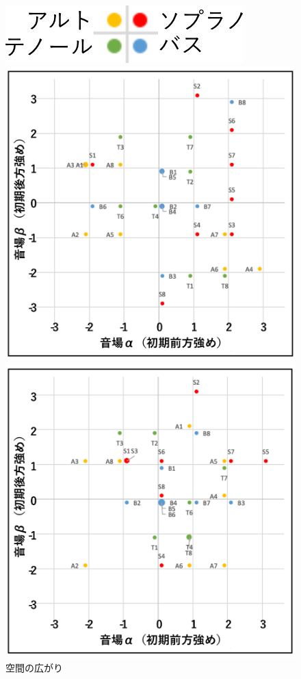 \documentclass[11pt,a4j]{jreport}
\begin{document}
\begin{figure}[H]
  \begin{minipage}{1\linewidth}
    \centering
    \includegraphics[scale=.7]{images/subjectiveExp/scat_0_legend.jpg}
  \end{minipage}

  \begin{minipage}{0.5\linewidth}
    \centering
    \includegraphics[width=.9\linewidth]{images/subjectiveExp/scat_early_04spacy.pdf}
    \caption*{空間の広がり}
  \end{minipage}%
  \begin{minipage}{0.5\linewidth}
    \centering
    \includegraphics[width=.9\linewidth]{images/subjectiveExp/scat_early_05audience.pdf}

\end{minipage}
\end{figure}
\end{document}
